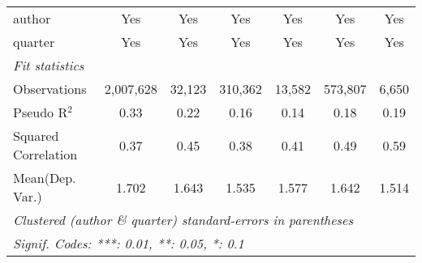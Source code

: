 \begin{tabular}{lcccccc}
   author                                                     & Yes       & Yes            & Yes           & Yes           & Yes           & Yes\\  
   quarter                                                    & Yes       & Yes            & Yes           & Yes           & Yes           & Yes\\  
   \midrule
   \emph{Fit statistics}\\
   Observations                                               & 2,007,628 & 32,123         & 310,362       & 13,582        & 573,807       & 6,650\\  
   Pseudo R$^2$                                               & 0.33      & 0.22           & 0.16          & 0.14          & 0.18          & 0.19\\  
   Squared Correlation                                        & 0.37      & 0.45           & 0.38          & 0.41          & 0.49          & 0.59\\  
Mean(Dep. Var.) & 1.702 & 1.643 & 1.535 & 1.577 & 1.642 & 1.514 \\
   \midrule \midrule
   \multicolumn{7}{l}{\emph{Clustered (author \& quarter) standard-errors in parentheses}}\\
   \multicolumn{7}{l}{\emph{Signif. Codes: ***: 0.01, **: 0.05, *: 0.1}}\\
\end{tabular}
\par\endgroup
